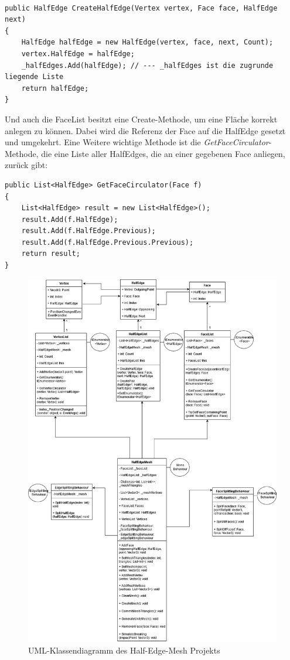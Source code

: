 \begin{lstlisting}

public HalfEdge CreateHalfEdge(Vertex vertex, Face face, HalfEdge next)
{
	HalfEdge halfEdge = new HalfEdge(vertex, face, next, Count);
	vertex.HalfEdge = halfEdge;
	_halfEdges.Add(halfEdge); // --- _halfEdges ist die zugrunde liegende Liste
	return halfEdge;
}

\end{lstlisting}

Und auch die FaceList besitzt eine Create-Methode, um eine Fl\"ache korrekt anlegen zu k\"onnen. Dabei wird die Referenz der Face auf die HalfEdge gesetzt und umgekehrt. Eine Weitere wichtige Methode ist die \textit{GetFaceCirculator}-Methode, die eine Liste aller HalfEdges, die an einer gegebenen Face anliegen, zur\"uck gibt:

\begin{lstlisting}
public List<HalfEdge> GetFaceCirculator(Face f)
{
	List<HalfEdge> result = new List<HalfEdge>();
	result.Add(f.HalfEdge);
	result.Add(f.HalfEdge.Previous);
	result.Add(f.HalfEdge.Previous.Previous);
	return result;
}
\end{lstlisting}

\begin{figure}[t]
	\centering
	\includegraphics[width=0.7\linewidth]{Images/ClassDiagramHalfEdgeMesh}
	\caption[HalfEdgeMeshUMLDiagramm]{UML-Klassendiagramm des Half-Edge-Mesh Projekts}
	\label{fig:classdiagramhalfedgemesh}
\end{figure}


